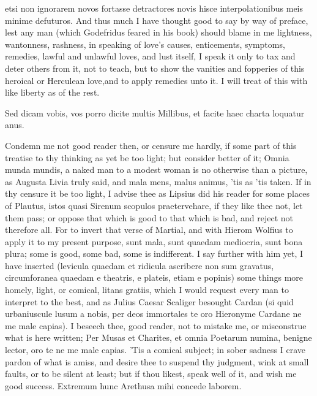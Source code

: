 {etsi non ignorarem novos fortasse detractores novis hisce
interpolationibus meis minime defuturos. 
And thus much I have thought good to say by way of preface, lest any
man (which Godefridus feared in his book) should blame in me
lightness, wantonness, rashness, in speaking of love's causes,
enticements, symptoms, remedies, lawful and unlawful loves, and lust
itself, I speak it only to tax and deter others from it, not to
teach, but to show the vanities and fopperies of this heroical or
Herculean love,and to apply remedies unto it. I will treat of
this with like liberty as of the rest.

Sed dicam vobis, vos porro dicite multis
Millibus, et facite haec charta loquatur anus.

Condemn me not good reader then, or censure me hardly, if some part of
this treatise to thy thinking as yet be too light; but consider better
of it; Omnia munda mundis, a naked man to a modest woman is no
otherwise than a picture, as Augusta Livia truly said, and mala
mens, malus animus, 'tis as 'tis taken. If in thy censure it be too
light, I advise thee as Lipsius did his reader for some places of
Plautus, istos quasi Sirenum scopulos praetervehare, if they like thee
not, let them pass; or oppose that which is good to that which is bad,
and reject not therefore all. For to invert that verse of Martial, and
with Hierom Wolfius to apply it to my present purpose, sunt mala, sunt
quaedam mediocria, sunt bona plura; some is good, some bad, some is
indifferent. I say further with him yet, I have inserted
(levicula quaedam et ridicula ascribere non sum gravatus,
circumforanea quaedam e theatris, e plateis, etiam e popinis) some
things more homely, light, or comical, litans gratiis, \etc{} which I
would request every man to interpret to the best, and as Julius Caesar
Scaliger besought Cardan (si quid urbaniuscule lusum a nobis, per deos
immortales te oro Hieronyme Cardane ne me male capias). I beseech thee,
good reader, not to mistake me, or misconstrue what is here written;
Per Musas et Charites, et omnia Poetarum numina, benigne lector, oro te
ne me male capias. 'Tis a comical subject; in sober sadness I crave
pardon of what is amiss, and desire thee to suspend thy judgment, wink
at small faults, or to be silent at least; but if thou likest, speak
well of it, and wish me good success. Extremum hunc Arethusa mihi
concede laborem.

}

